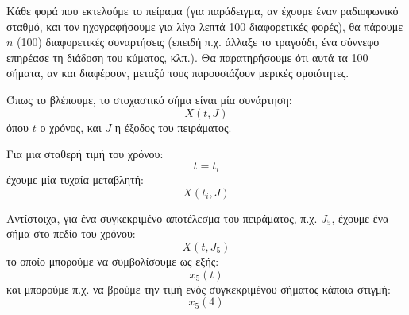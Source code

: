 \documentclass[11pt,a4paper,notitlepage,fleqn,final]{article}
\begin{document}
Κάθε φορά που εκτελούμε το πείραμα (για παράδειγμα, αν έχουμε
έναν ραδιοφωνικό σταθμό, και τον ηχογραφήσουμε για λίγα λεπτά 100
διαφορετικές φορές), θα πάρουμε \( n \) (100) διαφορετικές
συναρτήσεις (επειδή π.χ. άλλαξε το τραγούδι, ένα σύννεφο επηρέασε
τη διάδοση του κύματος, κλπ.). Θα παρατηρήσουμε ότι αυτά τα 100
σήματα, αν και διαφέρουν, μεταξύ τους παρουσιάζουν μερικές
ομοιότητες.

Όπως το βλέπουμε, το στοχαστικό σήμα είναι μία συνάρτηση:
\[
X(t,J)
\]
όπου \( t \) ο χρόνος, και \( J \) η έξοδος του πειράματος.

Για μια σταθερή τιμή του χρόνου:
\[
t=t_i
\]
έχουμε μία τυχαία μεταβλητή:
\[
X(t_i,J)
\]

Αντίστοιχα, για ένα συγκεκριμένο αποτέλεσμα του πειράματος, π.χ.
\( J_5 \), έχουμε ένα σήμα στο πεδίο του χρόνου:
\[
X(t,J_5)
\]
το οποίο μπορούμε να συμβολίσουμε ως εξής:
\[
x_5(t)
\]
και μπορούμε π.χ. να βρούμε την τιμή ενός συγκεκριμένου
σήματος κάποια στιγμή:
\[
x_5(4)
\]
\end{document}
